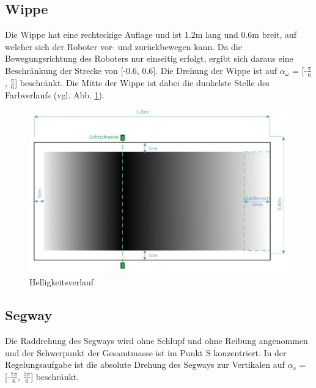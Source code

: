 \documentclass[pdf]{ifacconf}
\begin{document}
	\subsection{Wippe}
	Die Wippe hat eine rechteckige Auflage und ist 1.2m lang und 0.6m breit, auf 			welcher sich der Roboter vor- und zurückbewegen kann.
	Da die Bewegungsrichtung des Roboters nur einseitig erfolgt, ergibt sich daraus 		eine Beschränkung der Strecke von [-0.6, 0.6].
	Die Drehung der Wippe ist auf $\alpha^{}_{\omega}$ = [-$\frac{\pi}{6}$, $\frac{\pi}{6}$] beschränkt.
	Die Mitte der Wippe ist dabei die dunkelste Stelle des Farbverlaufs (vgl. Abb. \ref{fig:Helligkeit}).
	
	
	\begin{figure}[h]	
	\centerline{\includegraphics[width=\linewidth]{Bilder/Farbverlauf.jpg}}
	\caption{Helligkeitsverlauf}
	\label{fig:Helligkeit}
	\end{figure}
	
	\subsection{Segway}
	Die Raddrehung des Segways wird ohne Schlupf und ohne Reibung angenommen und der 		Schwerpunkt der Gesamtmasse ist im Punkt S konzentriert. 
	In der Regelungsaufgabe ist die absolute Drehung des Segways zur Vertikalen auf 		$\alpha^{}_{s}$ = [-$\frac{7\pi}{6}$, $\frac{7\pi}{6}$] beschränkt. %
\end{document}
